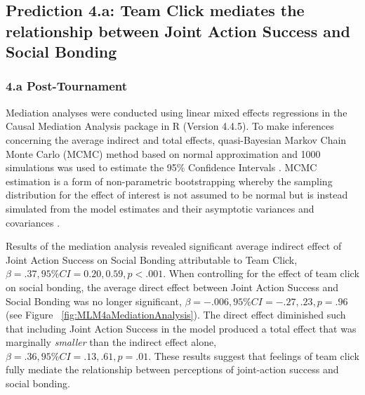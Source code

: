 \begin{landscape}
   






\subsection{Prediction 4.a: Team Click mediates the relationship between Joint Action Success and Social Bonding}

  \subsubsection{4.a Post-Tournament}
  Mediation analyses were conducted using linear mixed effects regressions in the Causal Mediation Analysis package in R (Version 4.4.5).  To make inferences concerning the average indirect and total effects, quasi-Bayesian Markov Chain Monte Carlo (MCMC) method based on normal approximation and 1000 simulations was used to estimate the 95\% Confidence Intervals \citep{Tofighi2016a,Imai2010}. MCMC estimation is a form of non-parametric bootstrapping whereby the sampling distribution for the effect of interest is not assumed to be normal but is instead simulated from the model estimates and their asymptotic variances and covariances \cite{Preacher2008}.

  Results of the mediation analysis revealed significant average indirect effect of Joint Action Success on Social Bonding attributable to Team Click, $\beta = .37, 95\% CI = 0.20 , 0.59, p < .001$.  When controlling for the effect of team click on social bonding, the average direct effect between Joint Action Success and Social Bonding was no longer significant, $\beta = -.006, 95\% CI = -.27 , .23, p = .96 $ (see Figure ~\ref{fig:MLM4aMediationAnalysis}). The direct effect diminished such that including Joint Action Success in the model produced a total effect that was marginally \textit{smaller} than the indirect effect alone, $\beta = .36, 95\% CI = .13 , .61, p = .01$. These results suggest that feelings of team click fully mediate the relationship between perceptions of joint-action success and social bonding.




\end{landscape}

